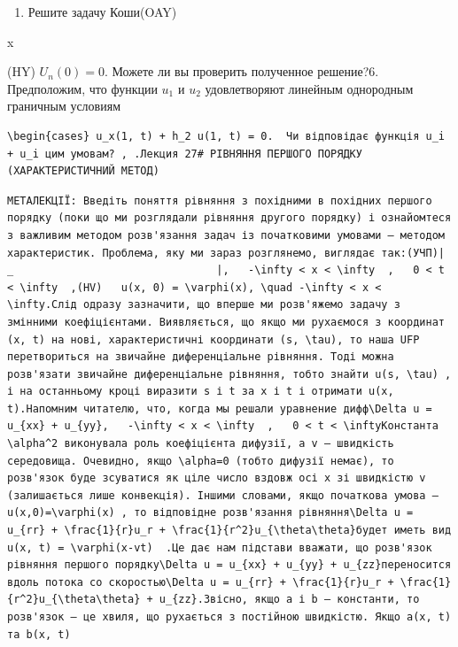 \documentclass[
  ukrainian,
]{article}
\providecommand{\tightlist}{%
  \setlength{\itemsep}{0pt}\setlength{\parskip}{0pt}}
\begin{document}
\begin{enumerate}
\def\labelenumi{\arabic{enumi}.}
\setcounter{enumi}{4}
\tightlist
\item
  Решите задачу Коши(OAY)
\end{enumerate}

x

(HY) \(U_n(0) = 0.\) Можете ли вы проверить полученное решение?6.
Предположим, что функции \(u_1\) и \(u_2\) удовлетворяют линейным
однородным граничным условиям

\begin{verbatim}
\begin{cases} u_x(1, t) + h_2 u(1, t) = 0.  Чи відповідає функція u_i + u_i цим умовам? , .Лекция 27# РІВНЯННЯ ПЕРШОГО ПОРЯДКУ (ХАРАКТЕРИСТИЧНИЙ МЕТОД)
\end{verbatim}

\begin{verbatim}
МЕТАЛЕКЦІЇ: Введіть поняття рівняння з похідними в похідних першого порядку (поки що ми розглядали рівняння другого порядку) і ознайомтеся з важливим методом розв'язання задач із початковими умовами — методом характеристик. Проблема, яку ми зараз розглянемо, виглядає так:(УЧП)| _                                |,   -\infty < x < \infty  ,   0 < t < \infty  ,(HV)   u(x, 0) = \varphi(x), \quad -\infty < x < \infty.Слід одразу зазначити, що вперше ми розв'яжемо задачу з змінними коефіцієнтами. Виявляється, що якщо ми рухаємося з координат (x, t) на нові, характеристичні координати (s, \tau), то наша UFP перетвориться на звичайне диференціальне рівняння. Тоді можна розв'язати звичайне диференціальне рівняння, тобто знайти u(s, \tau) , і на останньому кроці виразити s і t за x і t і отримати u(x, t).Напомним читателю, что, когда мы решали уравнение дифф\Delta u = u_{xx} + u_{yy},   -\infty < x < \infty  ,   0 < t < \inftyКонстанта \alpha^2 виконувала роль коефіцієнта дифузії, а v — швидкість середовища. Очевидно, якщо \alpha=0 (тобто дифузії немає), то розв'язок буде зсуватися як ціле число вздовж осі x зі швидкістю v (залишається лише конвекція). Іншими словами, якщо початкова умова — u(x,0)=\varphi(x) , то відповідне розв'язання рівняння\Delta u = u_{rr} + \frac{1}{r}u_r + \frac{1}{r^2}u_{\theta\theta}будет иметь вид   u(x, t) = \varphi(x-vt)  .Це дає нам підстави вважати, що розв'язок рівняння першого порядку\Delta u = u_{xx} + u_{yy} + u_{zz}переносится вдоль потока со скоростью\Delta u = u_{rr} + \frac{1}{r}u_r + \frac{1}{r^2}u_{\theta\theta} + u_{zz}.Звісно, якщо a і b — константи, то розв'язок — це хвиля, що рухається з постійною швидкістю. Якщо a(x, t) та b(x, t)
\end{verbatim}
\end{document}
